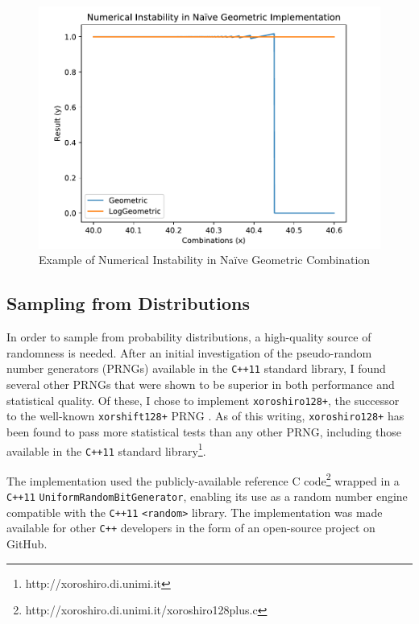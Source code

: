\documentclass[12pt,a4paper,twoside,openright]{report}
\begin{document}
\begin{figure}[H]
\centering
\includegraphics[width=400pt]{figs/instability.pdf}
\caption{Example of Numerical Instability in Naïve Geometric Combination}
\label{fig:num-instab}
\end{figure}

\subsection{Sampling from Distributions}

In order to sample from probability distributions, a high-quality source of
randomness is needed. After an initial investigation of the pseudo-random number
generators (PRNGs) available in the \texttt{C++11} standard library, I found
several other PRNGs that were shown to be superior in both performance and
statistical quality. Of these, I chose to implement \texttt{xoroshiro128+}, the
successor to the well-known \texttt{xorshift128+} PRNG \cite{vigna2017further}.
As of this writing, \texttt{xoroshiro128+} has been found to pass more
statistical tests than any other PRNG, including those available in the
\texttt{C++11} standard library\footnote{http://xoroshiro.di.unimi.it}. 

The implementation used the publicly-available reference C
code\footnote{http://xoroshiro.di.unimi.it/xoroshiro128plus.c} wrapped in a
\texttt{C++11} \texttt{UniformRandomBitGenerator}, enabling its use as a random
number engine compatible with the \texttt{C++11} \texttt{<random>} library. The
implementation was made available for other \texttt{C++} developers in the form
of an open-source project on GitHub.
\end{document}
